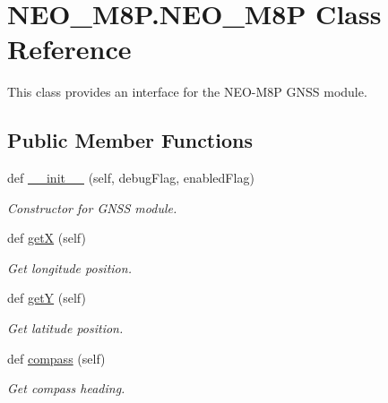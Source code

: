 \hypertarget{classNEO__M8P_1_1NEO__M8P}{}\section{N\+E\+O\+\_\+\+M8\+P.\+N\+E\+O\+\_\+\+M8P Class Reference}
\label{classNEO__M8P_1_1NEO__M8P}


This class provides an interface for the N\+E\+O-\/\+M8P G\+N\+SS module.  


\subsection*{Public Member Functions}
\begin{DoxyCompactItemize}
\item 
def \hyperlink{classNEO__M8P_1_1NEO__M8P_a5d5b2db5c78cf7bb3b716b0b0c97b63a}{\+\_\+\+\_\+init\+\_\+\+\_\+} (self, debug\+Flag, enabled\+Flag)
\begin{DoxyCompactList}\small\item\em Constructor for G\+N\+SS module. \end{DoxyCompactList}\item 
\mbox{\label{classNEO__M8P_1_1NEO__M8P_ab17d9fb05484b44754676e9de00c608b}} 
def \hyperlink{classNEO__M8P_1_1NEO__M8P_ab17d9fb05484b44754676e9de00c608b}{getX} (self)
\begin{DoxyCompactList}\small\item\em Get longitude position. \end{DoxyCompactList}\item 
\mbox{\label{classNEO__M8P_1_1NEO__M8P_a69779ad366f737d704563a4602360ca4}} 
def \hyperlink{classNEO__M8P_1_1NEO__M8P_a69779ad366f737d704563a4602360ca4}{getY} (self)
\begin{DoxyCompactList}\small\item\em Get latitude position. \end{DoxyCompactList}\item 
def \hyperlink{classNEO__M8P_1_1NEO__M8P_a41a9dab0d5eb74d6156a9c5da912435a}{compass} (self)
\begin{DoxyCompactList}\small\item\em Get compass heading. \end{DoxyCompactList}\end{DoxyCompactItemize}
